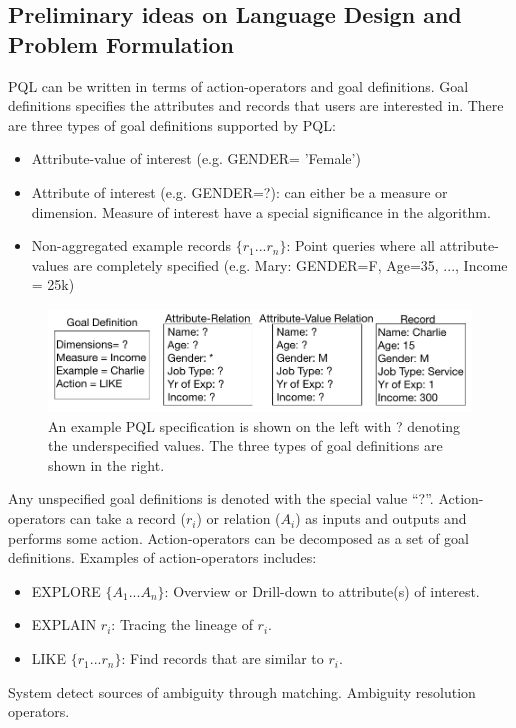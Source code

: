 \documentclass{sig-alternate-05-2015}
\begin{document}
\subsection{Preliminary ideas on Language Design and Problem Formulation}
PQL can be written in terms of action-operators and goal definitions. Goal definitions specifies the attributes and records that users are interested in. There are three types of goal definitions supported by PQL: 
\begin{itemize}
	\item Attribute-value of interest (e.g. GENDER= 'Female')
	\item Attribute of interest (e.g. GENDER=?): can either be a measure or dimension. Measure of interest have a special significance in the algorithm.
	\item Non-aggregated example records $\{r_1 ...r_n\}$: Point queries where all attribute-values are completely specified (e.g. Mary: GENDER=F, Age=35, ..., Income = 25k)
\end{itemize}
\begin{figure}[ht!]\label{nodeType}
\includegraphics[width=\linewidth]{figures/nodeTypes.png}
\caption{An example PQL specification is shown on the left with ? denoting the underspecified values. The three types of goal definitions are shown in the right.}
\end{figure}
Any unspecified goal definitions is denoted with the special value ``?''. Action-operators can take a record ($r_i$) or relation ($A_i$) as inputs and outputs and performs some action. Action-operators can be decomposed as a set of goal definitions. Examples of action-operators includes:   
\begin{itemize}
	\item EXPLORE $\{A_1 ...A_n\}$: Overview or Drill-down to attribute(s) of interest.
	\item EXPLAIN $r_i$: Tracing the lineage of $r_i$.
	\item LIKE $\{r_1 ...r_n\}$: Find records that are similar to $r_i$.
\end{itemize}
System detect sources of ambiguity through matching. Ambiguity resolution operators. 
\end{document}
